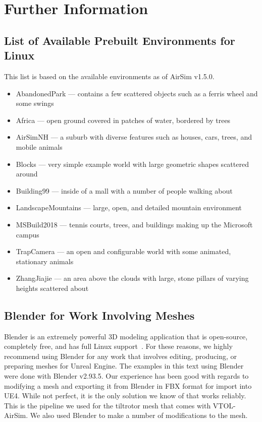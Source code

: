 
\chapter{Further Information}\label{apdx:further_info}

\section{List of Available Prebuilt Environments for Linux}\label{apdx:list_of_envs}

This list is based on the available environments as of AirSim v1.5.0.

\begin{itemize}
    \item AbandonedPark --- contains a few scattered objects such as a ferris wheel and some swings
    \item Africa --- open ground covered in patches of water, bordered by trees
    \item AirSimNH --- a suburb with diverse features such as houses, cars, trees, and mobile animals
    \item Blocks --- very simple example world with large geometric shapes scattered around
    \item Building99 --- inside of a mall with a number of people walking about
    \item LandscapeMountains --- large, open, and detailed mountain environment
    \item MSBuild2018 --- tennis courts, trees, and buildings making up the Microsoft campus
    \item TrapCamera --- an open and configurable world with some animated, stationary animals
    \item ZhangJiajie --- an area above the clouds with large, stone pillars of varying heights scattered about
\end{itemize}


\section{Blender for Work Involving Meshes}\label{apdx:blender}

Blender is an extremely powerful 3D modeling application that is open-source, completely free, and has full Linux support~\cite{Blender2021}. For these reasons, we highly recommend using Blender for any work that involves editing, producing, or preparing meshes for Unreal Engine. The examples in this text using Blender were done with Blender v2.93.5. Our experience has been good with regards to modifying a mesh and exporting it from Blender in FBX format for import into UE4. While not perfect, it is the only solution we know of that works reliably. This is the pipeline we used for the tiltrotor mesh that comes with VTOL-AirSim. We also used Blender to make a number of modifications to the mesh.

